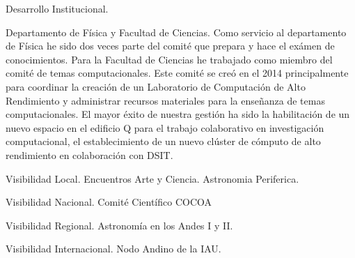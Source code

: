 Desarrollo Institucional.

Departamento de Física y Facultad de Ciencias. Como servicio al departamento de Física he sido dos veces parte del comité que prepara y hace el exámen de conocimientos. 
Para la Facultad de Ciencias he trabajado como miembro del comité de temas computacionales. Este comité se creó en el 2014 principalmente para coordinar la creación de un Laboratorio de Computación de Alto Rendimiento y administrar recursos materiales para la enseñanza de temas computacionales. El mayor éxito de nuestra gestión ha sido la habilitación de un nuevo espacio en el edificio Q para el trabajo colaborativo en investigación computacional, el establecimiento de un nuevo clúster de cómputo de alto rendimiento en colaboración con DSIT.

Visibilidad Local. Encuentros Arte y Ciencia. Astronomia Periferica.

Visibilidad Nacional. Comité Científico COCOA

Visibilidad Regional. Astronomía en los Andes I y II.

Visibilidad Internacional. Nodo Andino de la IAU. 



